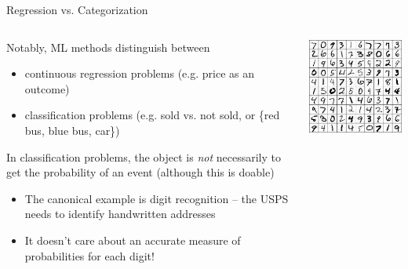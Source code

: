 \documentclass[notes,11pt, aspectratio=169]{beamer}
\newenvironment{wideitemize}{\itemize\addtolength{\itemsep}{10pt}}{\enditemize}
\begin{document}
\begin{frame}{Regression vs. Categorization}
    \begin{columns}[onlytextwidth, T] %
      \begin{column}{.5\textwidth}
  \begin{wideitemize}
  \item Notably, ML methods distinguish between
    \begin{itemize}
    \item continuous regression problems (e.g. price as an outcome)
    \item classification problems (e.g. sold vs. not sold, or \{red bus, blue bus, car\})
    \end{itemize}
  \item In classification problems, the object is \emph{not}
    necessarily to get the probability of an event (although this is doable)
    \begin{itemize}
    \item The canonical example is digit recognition -- the USPS needs
      to identify handwritten addresses
    \item It doesn't care about an accurate measure of probabilities
      for each digit!
    \end{itemize}
  \end{wideitemize}
      \end{column}%
      \hfill%
      \begin{column}{.5\textwidth}
        \includegraphics[width=\linewidth]{images/digits_1.jpeg}
      \end{column}%
    \end{columns}
\end{frame}
\end{document}
